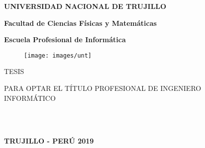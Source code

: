 

\textheight 19cm
\pagestyle{empty}
\begin{center}
 {\bf {\fontsize{14}{16.8}\selectfont UNIVERSIDAD NACIONAL DE TRUJILLO}}     
 
    {\bf{\fontsize{14}{16.8}\selectfont Facultad de Ciencias Físicas y Matemáticas}} 

  {\bf{\fontsize{14}{16.8}\selectfont Escuela Profesional de Informática}}
\end{center}  

\begin{figure}[ht]
\begin{center}
\texttt{[image: images/unt]}
\end{center}
\end{figure}
\vskip 0.5cm

\begin{center}
  {\bf\Large{{\fontsize{17}{20.4}\selectfont{\titleTesis} }}}     
\end{center}
\vskip 0.5cm

\begin{center}
{\Large{TESIS}}
\end{center}
\begin{center}
{\large{\hspace*{0.4cm} PARA OPTAR EL TÍTULO PROFESIONAL DE INGENIERO  INFORMÁTICO}}
\end{center}

\vskip 0.6cm
\begin{center}
  { \fontsize{14}{16.8}} \\
    { \fontsize{14}{16.8}\selectfont {\hspace{-0.4cm} \authorTwo}}\\
    \vskip 0.2cm
    { \fontsize{14}{16.8}}

     
\end{center}   


\vskip 1.1cm
\begin{center}    
{\bf {\fontsize{14}{16.8}\selectfont TRUJILLO - PERÚ
\vskip 0.0cm
\hspace*{-0.2cm} 
2019 }}
\end{center} 
\newpage


